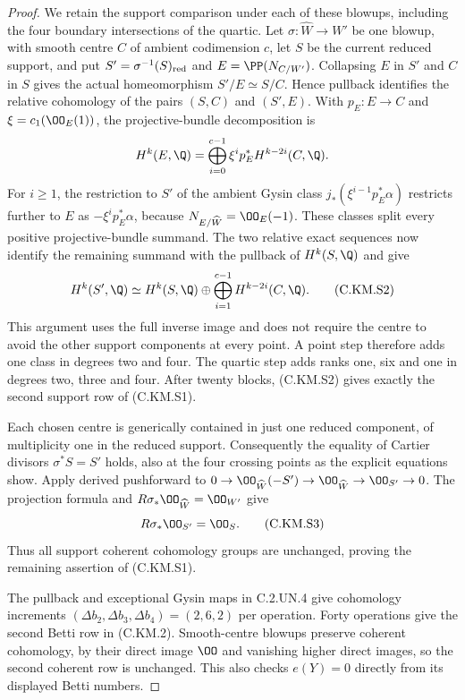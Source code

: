 \begin{proof}
We retain the support comparison under each of these blowups,
including the four boundary intersections of the quartic.
Let $\sigma:\widehat W\to W'$ be one blowup, with smooth
centre $C$ of ambient codimension $c$, let $S$ be the current
reduced support, and put $S'=\sigma^{-1}(S)_{\rm red}$ and
$E=\PP(N_{C/W'})$. Collapsing $E$ in $S'$ and $C$ in $S$
gives the actual homeomorphism $S'/E\simeq S/C$.
Hence pullback identifies the relative cohomology of the
pairs $(S,C)$ and $(S',E)$. With $p_E:E\to C$ and
$\xi=c_1(\OO_E(1))$, the projective-bundle decomposition is
\[
 H^k(E,\Q)=\bigoplus_{i=0}^{c-1}
                \xi^i p_E^*H^{k-2i}(C,\Q).
\]
For $i\ge1$, the restriction to $S'$ of the ambient Gysin
class $j_*(\xi^{i-1}p_E^*\alpha)$ restricts further to $E$
as $-\xi^i p_E^*\alpha$, because $N_{E/\widehat W}=\OO_E(-1)$.
These classes split every positive projective-bundle summand.
The two relative exact sequences now identify the remaining
summand with the pullback of $H^k(S,\Q)$ and give
\[
 H^k(S',\Q)\simeq H^k(S,\Q)\oplus
                \bigoplus_{i=1}^{c-1}H^{k-2i}(C,\Q).
                                                        \tag{C.KM.S2}
\]
This argument uses the full inverse image and does not require
the centre to avoid the other support components at every point.
A point step therefore adds one class in degrees two and four.
The quartic step adds ranks one, six and one in degrees two,
three and four. After twenty blocks, (C.KM.S2) gives exactly
the second support row of (C.KM.S1).

Each chosen centre is generically contained in just one
reduced component, of multiplicity one in the reduced support.
Consequently the equality of Cartier divisors
$\sigma^*S=S'$ holds, also at the four crossing points as
the explicit equations show. Apply derived pushforward to
$0\to\OO_{\widehat W}(-S')\to\OO_{\widehat W}\to
\OO_{S'}\to0$. The projection formula and
$R\sigma_*\OO_{\widehat W}=\OO_{W'}$ give
\[
                         R\sigma_*\OO_{S'}=\OO_S.       \tag{C.KM.S3}
\]
Thus all support coherent cohomology groups are unchanged,
proving the remaining assertion of (C.KM.S1).

The pullback and exceptional Gysin maps in C.2.UN.4
give cohomology increments $(\Delta b_2,\Delta b_3,
\Delta b_4)=(2,6,2)$ per operation. Forty operations
give the second Betti row in (C.KM.2). Smooth-centre
blowups preserve coherent cohomology, by their direct
image $\OO$ and vanishing higher direct images, so
the second coherent row is unchanged. This also checks
$e(Y)=0$ directly from its displayed Betti numbers.


\end{proof}
